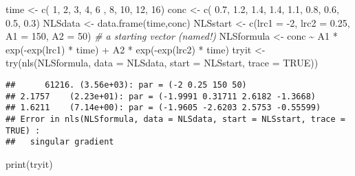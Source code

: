 \documentclass[
]{article}
\newenvironment{Shaded}{\begin{snugshade}}{\end{snugshade}}
\newcommand{\AttributeTok}[1]{\textcolor[rgb]{0.77,0.63,0.00}{#1}}
\newcommand{\CommentTok}[1]{\textcolor[rgb]{0.56,0.35,0.01}{\textit{#1}}}
\newcommand{\ConstantTok}[1]{\textcolor[rgb]{0.00,0.00,0.00}{#1}}
\newcommand{\DecValTok}[1]{\textcolor[rgb]{0.00,0.00,0.81}{#1}}
\newcommand{\FloatTok}[1]{\textcolor[rgb]{0.00,0.00,0.81}{#1}}
\newcommand{\FunctionTok}[1]{\textcolor[rgb]{0.00,0.00,0.00}{#1}}
\newcommand{\NormalTok}[1]{#1}
\newcommand{\OtherTok}[1]{\textcolor[rgb]{0.56,0.35,0.01}{#1}}
\newcommand{\SpecialCharTok}[1]{\textcolor[rgb]{0.00,0.00,0.00}{#1}}
\begin{document}
\begin{Shaded}
\begin{Highlighting}[]
\NormalTok{time }\OtherTok{\textless{}{-}} \FunctionTok{c}\NormalTok{( }\DecValTok{1}\NormalTok{,  }\DecValTok{2}\NormalTok{,  }\DecValTok{3}\NormalTok{,  }\DecValTok{4}\NormalTok{,  }\DecValTok{6}\NormalTok{ , }\DecValTok{8}\NormalTok{, }\DecValTok{10}\NormalTok{, }\DecValTok{12}\NormalTok{, }\DecValTok{16}\NormalTok{)}
\NormalTok{conc }\OtherTok{\textless{}{-}} \FunctionTok{c}\NormalTok{( }\FloatTok{0.7}\NormalTok{, }\FloatTok{1.2}\NormalTok{, }\FloatTok{1.4}\NormalTok{, }\FloatTok{1.4}\NormalTok{, }\FloatTok{1.1}\NormalTok{, }\FloatTok{0.8}\NormalTok{, }\FloatTok{0.6}\NormalTok{, }\FloatTok{0.5}\NormalTok{, }\FloatTok{0.3}\NormalTok{)}
\NormalTok{NLSdata }\OtherTok{\textless{}{-}} \FunctionTok{data.frame}\NormalTok{(time,conc)}
\NormalTok{NLSstart }\OtherTok{\textless{}{-}} \FunctionTok{c}\NormalTok{(}\AttributeTok{lrc1 =} \SpecialCharTok{{-}}\DecValTok{2}\NormalTok{, }\AttributeTok{lrc2 =} \FloatTok{0.25}\NormalTok{, }\AttributeTok{A1 =} \DecValTok{150}\NormalTok{, }\AttributeTok{A2 =} \DecValTok{50}\NormalTok{) }\CommentTok{\# a starting vector (named!)}
\NormalTok{NLSformula }\OtherTok{\textless{}{-}}\NormalTok{ conc }\SpecialCharTok{\textasciitilde{}}\NormalTok{ A1 }\SpecialCharTok{*} \FunctionTok{exp}\NormalTok{(}\SpecialCharTok{{-}}\FunctionTok{exp}\NormalTok{(lrc1) }\SpecialCharTok{*}\NormalTok{ time) }\SpecialCharTok{+}\NormalTok{ A2 }\SpecialCharTok{*} \FunctionTok{exp}\NormalTok{(}\SpecialCharTok{{-}}\FunctionTok{exp}\NormalTok{(lrc2) }\SpecialCharTok{*}\NormalTok{ time)}
\NormalTok{tryit }\OtherTok{\textless{}{-}} \FunctionTok{try}\NormalTok{(}\FunctionTok{nls}\NormalTok{(NLSformula, }\AttributeTok{data =}\NormalTok{ NLSdata, }\AttributeTok{start =}\NormalTok{ NLSstart, }\AttributeTok{trace =} \ConstantTok{TRUE}\NormalTok{))}
\end{Highlighting}
\end{Shaded}

\begin{verbatim}
##      61216. (3.56e+03): par = (-2 0.25 150 50)
## 2.1757    (2.23e+01): par = (-1.9991 0.31711 2.6182 -1.3668)
## 1.6211    (7.14e+00): par = (-1.9605 -2.6203 2.5753 -0.55599)
## Error in nls(NLSformula, data = NLSdata, start = NLSstart, trace = TRUE) : 
##   singular gradient
\end{verbatim}

\begin{Shaded}
\begin{Highlighting}[]
\FunctionTok{print}\NormalTok{(tryit)}
\end{Highlighting}
\end{Shaded}
\end{document}
